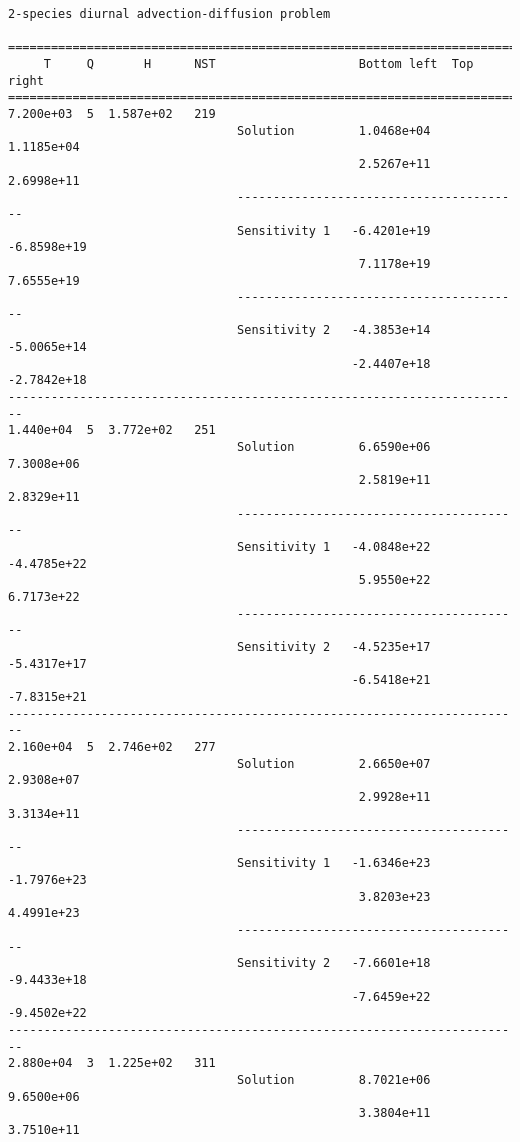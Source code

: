 \begin{verbatim}
2-species diurnal advection-diffusion problem

========================================================================
     T     Q       H      NST                    Bottom left  Top right 
========================================================================
7.200e+03  5  1.587e+02   219
                                Solution         1.0468e+04   1.1185e+04 
                                                 2.5267e+11   2.6998e+11 
                                ----------------------------------------
                                Sensitivity 1   -6.4201e+19  -6.8598e+19 
                                                 7.1178e+19   7.6555e+19 
                                ----------------------------------------
                                Sensitivity 2   -4.3853e+14  -5.0065e+14 
                                                -2.4407e+18  -2.7842e+18 
------------------------------------------------------------------------
1.440e+04  5  3.772e+02   251
                                Solution         6.6590e+06   7.3008e+06 
                                                 2.5819e+11   2.8329e+11 
                                ----------------------------------------
                                Sensitivity 1   -4.0848e+22  -4.4785e+22 
                                                 5.9550e+22   6.7173e+22 
                                ----------------------------------------
                                Sensitivity 2   -4.5235e+17  -5.4317e+17 
                                                -6.5418e+21  -7.8315e+21 
------------------------------------------------------------------------
2.160e+04  5  2.746e+02   277
                                Solution         2.6650e+07   2.9308e+07 
                                                 2.9928e+11   3.3134e+11 
                                ----------------------------------------
                                Sensitivity 1   -1.6346e+23  -1.7976e+23 
                                                 3.8203e+23   4.4991e+23 
                                ----------------------------------------
                                Sensitivity 2   -7.6601e+18  -9.4433e+18 
                                                -7.6459e+22  -9.4502e+22 
------------------------------------------------------------------------
2.880e+04  3  1.225e+02   311
                                Solution         8.7021e+06   9.6500e+06 
                                                 3.3804e+11   3.7510e+11 

\end{verbatim}
